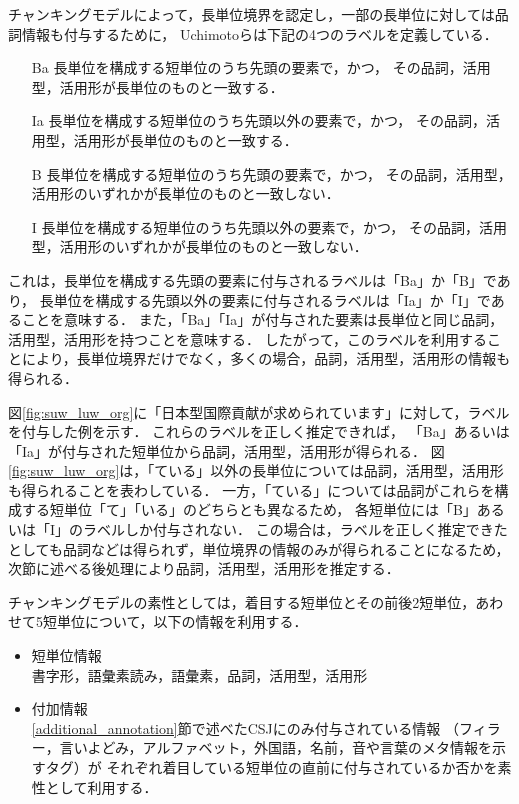 \documentclass[japanese]{jnlp_1.4}
\begin{document}
チャンキングモデルによって，長単位境界を認定し，一部の長単位に対しては品詞情報も付与するために，
Uchimotoらは下記の4つのラベルを定義している．

\begin{itemize}
\item[Ba] 長単位を構成する短単位のうち先頭の要素で，かつ，
その品詞，活用型，活用形が長単位のものと一致する．
\item[Ia] 長単位を構成する短単位のうち先頭以外の要素で，かつ，
その品詞，活用型，活用形が長単位のものと一致する．
\item[B] 長単位を構成する短単位のうち先頭の要素で，かつ，
その品詞，活用型，活用形のいずれかが長単位のものと一致しない．
\item[I] 長単位を構成する短単位のうち先頭以外の要素で，かつ，
その品詞，活用型，活用形のいずれかが長単位のものと一致しない．
\end{itemize}
これは，長単位を構成する先頭の要素に付与されるラベルは「Ba」か「B」であり，
長単位を構成する先頭以外の要素に付与されるラベルは「Ia」か「I」であることを意味する．
また，「Ba」「Ia」が付与された要素は長単位と同じ品詞，活用型，活用形を持つことを意味する．
したがって，このラベルを利用することにより，長単位境界だけでなく，多くの場合，品詞，活用型，活用形の情報も得られる．

図\ref{fig:suw_luw_org}に「日本型国際貢献が求められています」に対して，ラベルを付与した例を示す．
これらのラベルを正しく推定できれば，
\pagebreak
「Ba」あるいは「Ia」が付与された短単位から品詞，活用型，活用形が得られる．
図\ref{fig:suw_luw_org}は，「ている」以外の長単位については品詞，活用型，活用形も得られることを表わしている．
一方，「ている」については品詞がこれらを構成する短単位「て」「いる」のどちらとも異なるため，
各短単位には「B」あるいは「I」のラベルしか付与されない．
この場合は，ラベルを正しく推定できたとしても品詞などは得られず，単位境界の情報のみが得られることになるため，
次節に述べる後処理により品詞，活用型，活用形を推定する．

チャンキングモデルの素性としては，着目する短単位とその前後2短単位，あわせて5短単位について，以下の情報を利用する．
\begin{itemize}
\item 短単位情報 \\
書字形，語彙素読み，語彙素，品詞，活用型，活用形
\item 付加情報 \\
\ref{additional_annotation}節で述べたCSJにのみ付与されている情報
（フィラー，言いよどみ，アルファベット，外国語，名前，音や言葉のメタ情報を示すタグ）が
それぞれ着目している短単位の直前に付与されているか否かを素性として利用する．
\end{itemize}
\end{document}
